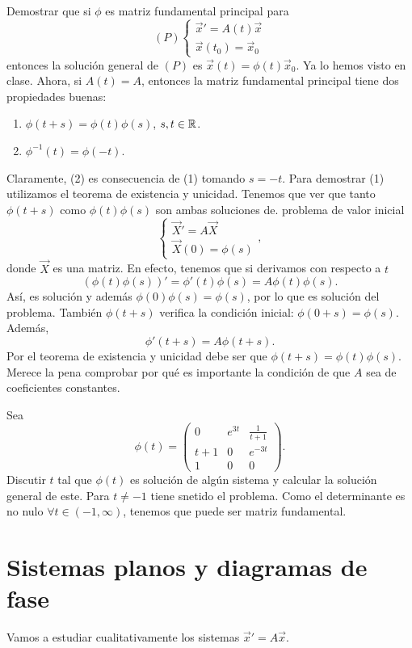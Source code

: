 \begin{eg}
Demostrar que si $\displaystyle \phi $ es matriz fundamental principal para
\[\left(P\right)
\begin{cases}
\vec{x}' = A\left(t\right)\vec{x} \\
\vec{x}\left(t_{0}\right)=\vec{x}_{0}
\end{cases}
\]
entonces la solución general de $\displaystyle \left(P\right) $ es $\displaystyle \vec{x}\left(t\right)=\phi\left(t\right)\vec{x}_{0} $. Ya lo hemos visto en clase. Ahora, si $\displaystyle A\left(t\right)=A $, entonces la matriz fundamental principal tiene dos propiedades buenas:
\begin{enumerate}
\item $\displaystyle \phi\left(t + s\right)= \phi\left(t\right)\phi\left(s\right) $, $\displaystyle s,t \in \mathbb{R} $. 
\item $\displaystyle \phi^{-1}\left(t\right)=\phi\left(-t\right) $. 
\end{enumerate}
Claramente, (2) es consecuencia de (1) tomando $\displaystyle s = -t $. Para demostrar (1) utilizamos el teorema de existencia y unicidad. Tenemos que ver que tanto $\displaystyle \phi\left(t + s\right) $ como $\displaystyle \phi\left(t\right)\phi\left(s\right) $ son ambas soluciones de. problema de valor inicial
\[
\begin{cases}
\vec{X}' = A\vec{X} \\
\vec{X}\left(0\right)=\phi\left(s\right)
\end{cases}
,\]
donde $\displaystyle \vec{X} $ es una matriz. 
En efecto, tenemos que si derivamos con respecto a $\displaystyle t $ 
\[\left(\phi\left(t\right)\phi\left(s\right)\right)' = \phi'\left(t\right)\phi\left(s\right) = A\phi\left(t\right)\phi\left(s\right).\]
Así, es solución y además $\displaystyle \phi\left(0\right)\phi\left(s\right)=\phi\left(s\right) $, por lo que es solución del problema. También $\displaystyle \phi\left(t + s\right) $ verifica la condición inicial: $\displaystyle \phi\left(0 + s\right)= \phi\left(s\right) $. Además, 
\[\phi'\left(t + s\right)=A\phi\left(t + s\right) .\]
Por el teorema de existencia y unicidad debe ser que $\displaystyle \phi\left(t + s\right)=\phi\left(t\right)\phi\left(s\right) $. Merece la pena comprobar por qué es importante la condición de que $\displaystyle A $ sea de coeficientes constantes. 
\end{eg}
\begin{eg}
Sea
\[\phi\left(t\right)=\begin{pmatrix} 0 & e^{3t} & \frac{1}{t+1} \\ t+1 & 0 & e^{-3t} \\ 1 & 0 & 0 \end{pmatrix} .\]
Discutir $\displaystyle t $ tal que $\displaystyle \phi\left(t\right) $ es solución de algún sistema y calcular la solución general de este. Para $\displaystyle t \neq -1 $ tiene snetido el problema. Como el determinante es no nulo $\displaystyle \forall t \in \left(-1, \infty\right) $, tenemos que puede ser matriz fundamental. 
\end{eg}
\section{Sistemas planos y diagramas de fase}
Vamos a estudiar cualitativamente los sistemas $\displaystyle \vec{x}' = A\vec{x} $. 
